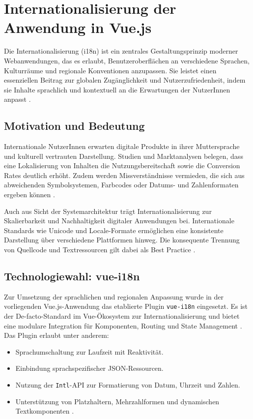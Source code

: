 \section{Internationalisierung der Anwendung in Vue.js}
\label{sec:i18n}

Die Internationalisierung (i18n) ist ein zentrales Gestaltungsprinzip moderner Webanwendungen, das es erlaubt, Benutzeroberflächen an verschiedene Sprachen, Kulturräume und regionale Konventionen anzupassen. Sie leistet einen essenziellen Beitrag zur globalen Zugänglichkeit und Nutzerzufriedenheit, indem sie Inhalte sprachlich und kontextuell an die Erwartungen der NutzerInnen anpasst \cite{Stallmann2015}.

\subsection{Motivation und Bedeutung}
Internationale NutzerInnen erwarten digitale Produkte in ihrer Muttersprache und kulturell vertrauten Darstellung. Studien und Marktanalysen belegen, dass eine Lokalisierung von Inhalten die Nutzungsbereitschaft sowie die Conversion Rates deutlich erhöht. Zudem werden Missverständnisse vermieden, die sich aus abweichenden Symbolsystemen, Farbcodes oder Datums- und Zahlenformaten ergeben können \cite{Stallmann2015}.

Auch aus Sicht der Systemarchitektur trägt Internationalisierung zur Skalierbarkeit und Nachhaltigkeit digitaler Anwendungen bei. Internationale Standards wie Unicode und Locale-Formate ermöglichen eine konsistente Darstellung über verschiedene Plattformen hinweg. Die konsequente Trennung von Quellcode und Textressourcen gilt dabei als Best Practice \cite{vuei18nDocs2024}.

\subsection{Technologiewahl: vue-i18n}
Zur Umsetzung der sprachlichen und regionalen Anpassung wurde in der vorliegenden Vue.js-Anwendung das etablierte Plugin \texttt{vue-i18n} eingesetzt. Es ist der De-facto-Standard im Vue-\"Okosystem zur Internationalisierung und bietet eine modulare Integration für Komponenten, Routing und State Management \cite{vuei18nDocs2024}. Das Plugin erlaubt unter anderem:

\begin{itemize}
	\item Sprachumschaltung zur Laufzeit mit Reaktivität.
	\item Einbindung sprachspezifischer JSON-Ressourcen.
	\item Nutzung der \texttt{Intl}-API zur Formatierung von Datum, Uhrzeit und Zahlen.
	\item Unterstützung von Platzhaltern, Mehrzahlformen und dynamischen Textkomponenten \cite{Krukowski2024}.
\end{itemize}


